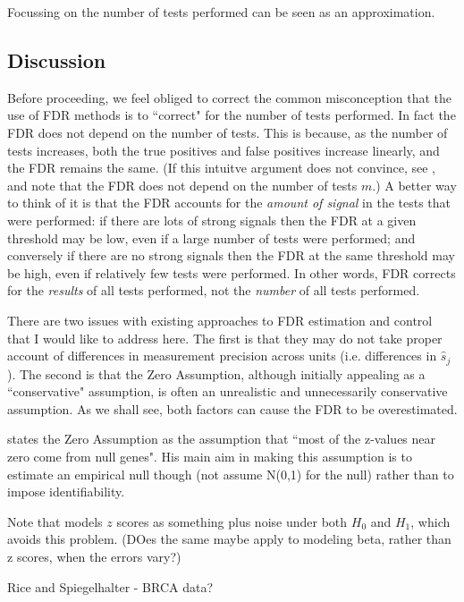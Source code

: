 \documentclass[11pt]{article}
\def\shat{\hat{s}}
\begin{document}
Focussing on the number of tests performed can be
seen as an approximation. 


\subsection{Discussion}

Before proceeding, we feel obliged to correct the common misconception
 that the use of FDR methods is to ``correct" for the number of tests performed. In fact the FDR does
 not depend on the number of tests. This is because, as the number of tests increases, both the true positives and false positives increase linearly,
 and the FDR remains the same. (If this intuitve argument does not convince, see \cite{storey.xx}, and note that the FDR does not depend on the number of tests $m$.)
  A better way to think of it is that the FDR accounts for the {\it amount of signal} in the tests that were performed: 
 if there are lots of strong signals then the FDR at a given threshold may be low, even if a large number of tests were performed; and conversely
 if there are no strong signals then the FDR at the same threshold may be high, even if relatively few tests were performed. 
 In other words, FDR corrects for the {\it results} of all tests performed, not the {\it number} of all tests performed.
 

 There are two issues with existing approaches to FDR estimation and control that I would like to address here. 
 The first is that they may do not take proper account of differences in measurement precision across units (i.e. differences in $\shat_j$). 
 The second is that the Zero Assumption, although initially appealing as a ``conservative" assumption,
  is often an unrealistic and unnecessarily conservative assumption. As we shall see, both factors can cause the FDR to be overestimated.
 

\cite{efron2008microarrays} states the Zero Assumption as the assumption that ``most of the z-values near zero come from null genes".
His main aim in making this assumption is to estimate an empirical null though (not assume N(0,1) for the null)
rather than to impose identifiability.

Note that \cite{muralidharan2010empirical} models $z$ scores as something plus noise under both $H_0$ and $H_1$, which
avoids this problem. (DOes the same maybe apply to modeling beta, rather than z scores, when the errors vary?)

Rice and Spiegelhalter - BRCA data?
\end{document}
